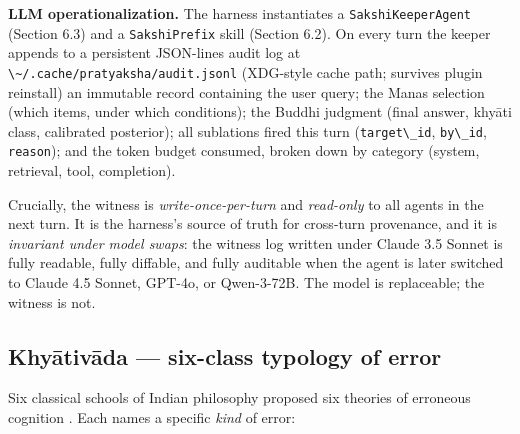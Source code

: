 \textbf{LLM operationalization.} The harness instantiates a \passthrough{\lstinline!SakshiKeeperAgent!} (Section 6.3) and a \passthrough{\lstinline!SakshiPrefix!} skill (Section 6.2). On every turn the keeper appends to a persistent JSON-lines audit log at \passthrough{\lstinline!\~/.cache/pratyaksha/audit.jsonl!} (XDG-style cache path; survives plugin reinstall) an immutable record containing the user query; the Manas selection (which items, under which conditions); the Buddhi judgment (final answer, khyāti class, calibrated posterior); all sublations fired this turn (\passthrough{\lstinline!target\_id!}, \passthrough{\lstinline!by\_id!}, \passthrough{\lstinline!reason!}); and the token budget consumed, broken down by category (system, retrieval, tool, completion).

Crucially, the witness is \emph{write-once-per-turn} and \emph{read-only} to all agents in the next turn. It is the harness's source of truth for cross-turn provenance, and it is \emph{invariant under model swaps}: the witness log written under Claude 3.5 Sonnet is fully readable, fully diffable, and fully auditable when the agent is later switched to Claude 4.5 Sonnet, GPT-4o, or Qwen-3-72B. The model is replaceable; the witness is not.

\subsection{Khyātivāda --- six-class typology of error}\label{khyux101tivux101da-six-class-typology-of-error}

Six classical schools of Indian philosophy proposed six theories of erroneous cognition \citep{ram2007error, matilal1986perception, datta1932advaita, bhatt1989prabhakara, bilimoria2018epistemology, mohanty1992reason}. Each names a specific \emph{kind} of error:

